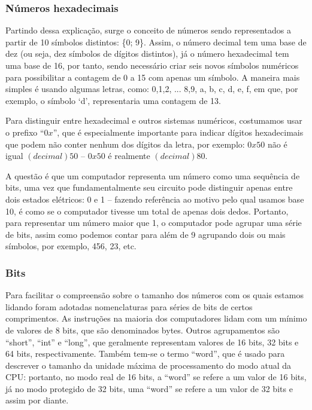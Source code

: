 \subsubsection{Números hexadecimais}

Partindo dessa explicação, surge o conceito de números sendo representados a partir de 10 símbolos distintos: \{0; 9\}. Assim, o número decimal tem uma base de dez (ou seja, dez símbolos de dígitos distintos), já o número hexadecimal tem uma base de 16, por tanto, sendo necessário criar seis novos símbolos numéricos para possibilitar a contagem de 0 a 15 com apenas um símbolo. A maneira mais simples é usando algumas letras, como: 0,1,2, ... 8,9, a, b, c, d, e, f, em que, por exemplo, o símbolo `d', representaria uma contagem de 13.

Para distinguir entre hexadecimal e outros sistemas numéricos, costumamos usar o prefixo ``$0x$'', que é especialmente importante para indicar dígitos hexadecimais que podem não conter nenhum dos dígitos da letra, por exemplo: $0x50$ não é igual $(decimal) 50$ – $0x50$ é realmente $(decimal) 80$.

A questão é que um computador representa um número como uma sequência de bits, uma vez que fundamentalmente seu circuito pode distinguir apenas entre dois estados elétricos: 0 e 1 – fazendo referência ao motivo pelo qual usamos base 10, é como se o computador tivesse um total de apenas dois dedos. Portanto, para representar um número maior que 1, o computador pode agrupar uma série de bits, assim como podemos contar para além de 9 agrupando dois ou mais símbolos, por exemplo, 456, 23, etc.

\subsubsection{Bits}

Para facilitar o compreensão sobre o tamanho dos números com os quais estamos lidando foram adotadas nomenclaturas para séries de bits de certos comprimentos. As instruções na maioria dos computadores lidam com um mínimo de valores de 8 bits, que são denominados bytes. Outros agrupamentos são ``short'', ``int'' e ``long'', que geralmente representam valores de 16 bits, 32 bits e 64 bits, respectivamente. Também tem-se o termo ``word'', que é usado para descrever o tamanho da unidade máxima de processamento do modo atual da CPU: portanto, no modo real de 16 bits, a ``word'' se refere a um valor de 16 bits, já no modo protegido de 32 bits, uma ``word'' se refere a um valor de 32 bits e assim por diante.

